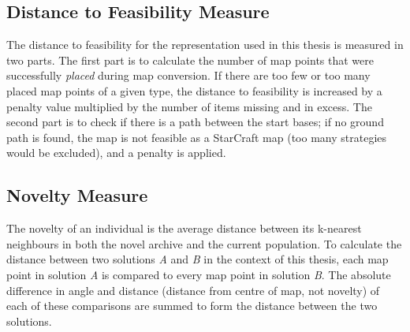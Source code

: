 \subsection{Distance to Feasibility Measure}
\label{methodology_csn_distance}
The distance to feasibility for the representation used in this thesis is measured in two parts. The first part is to calculate the number of map points that were successfully \textit{placed} during map conversion. If there are too few or too many placed map points of a given type, the distance to feasibility is increased by a penalty value multiplied by the number of items missing and in excess. The second part is to check if there is a path between the start bases; if no ground path is found, the map is not feasible as a StarCraft map (too many strategies would be excluded), and a penalty is applied.

\subsection{Novelty Measure}
\label{methodology_csn_measure}
The novelty of an individual is the average distance between its k-nearest neighbours in both the novel archive and the current population. To calculate the distance between two solutions \textit{A} and \textit{B} in the context of this thesis, each map point in solution \textit{A} is compared to every map point in solution \textit{B}. The absolute difference in angle and distance (distance from centre of map, not novelty) of each of these comparisons are summed to form the distance between the two solutions.